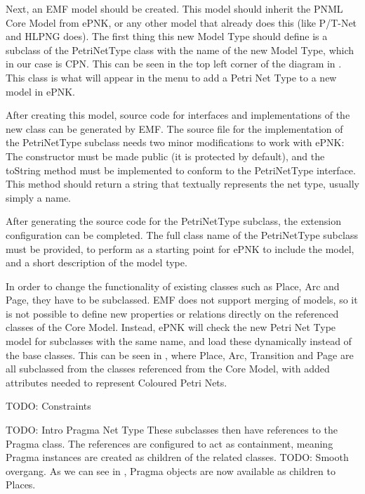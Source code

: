 Next, an EMF model should be created. This model should inherit
the PNML Core Model from ePNK, or any other model that already does this (like
P/T-Net and HLPNG does).  The first thing
this new Model Type should define is a subclass of the PetriNetType class with
the name of the new Model Type, which in our case is CPN. This can be seen in
the top left corner of the diagram in . This class is what
will appear in the menu to add a Petri Net Type to a new model in ePNK.


After creating this model, source code for interfaces and implementations of
the new class can be generated by EMF.  The source file for
the implementation of the PetriNetType subclass needs two minor modifications
to work with ePNK: The constructor must be made public (it is protected by
default), and the toString method must be implemented to conform to the
PetriNetType interface. This method should return a string that textually
represents the net type, usually simply a name.

After generating the source code for the PetriNetType subclass, the extension
configuration can be completed. The full class name of the PetriNetType subclass
must be provided, to perform as a starting point for ePNK to include the model,
and a short description of the model type. 

In order to change the functionality of existing classes such as Place, Arc and
Page, they have to be subclassed. EMF does not support
merging of models, so it is not possible to define new properties or relations
directly on the referenced classes of the Core Model. Instead, ePNK will check
the new Petri Net Type model for subclasses with the same name, and load these
dynamically instead of the base classes. This can be seen in
, where Place, Arc, Transition and Page are all
subclassed from the classes referenced from the Core Model, with added
attributes needed to represent Coloured Petri Nets.

TODO: Constraints

TODO: Intro Pragma Net Type
These subclasses then have references to the Pragma class. The references are
configured to act as containment, meaning Pragma instances are created as
children of the related classes. TODO: Smooth overgang. As we can see in
, Pragma objects are now available as children to Places.


